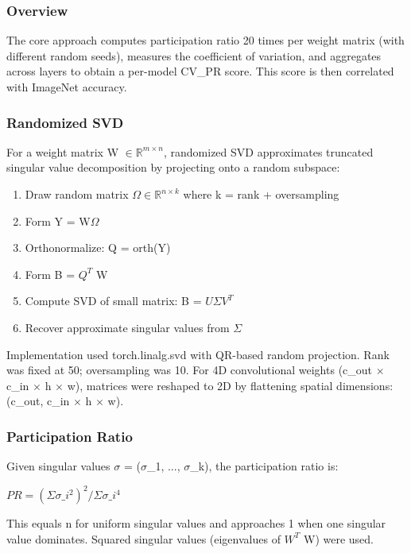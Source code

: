 
\subsubsection{Overview}

The core approach computes participation ratio 20 times per weight matrix (with different random seeds), measures the coefficient of variation, and aggregates across layers to obtain a per-model CV\_PR score. This score is then correlated with ImageNet accuracy.

\subsubsection{Randomized SVD}

For a weight matrix W $\in \mathbb{R}^{m\times n}$, randomized SVD \citep{Halko2011Finding} approximates truncated singular value decomposition by projecting onto a random subspace:

\begin{enumerate}
\item Draw random matrix $\Omega \in \mathbb{R}^{n\times k}$ where k = rank + oversampling
\item Form Y = W$\Omega$
\item Orthonormalize: Q = orth(Y)
\item Form B = $Q^T$ W
\item Compute SVD of small matrix: B = $U\Sigma V^T$
\item Recover approximate singular values from $\Sigma$
\end{enumerate}

Implementation used torch.linalg.svd with QR-based random projection. Rank was fixed at 50; oversampling was 10. For 4D convolutional weights (c\_out $\times$ c\_in $\times$ h $\times$ w), matrices were reshaped to 2D by flattening spatial dimensions: (c\_out, c\_in $\times$ h $\times$ w).

\subsubsection{Participation Ratio}

Given singular values $\sigma$ = ($\sigma$\_1, ..., $\sigma$\_k), the participation ratio is:

$PR = (\Sigma \sigma\_i^{2})^2 / \Sigma \sigma\_i^4$

This equals n for uniform singular values and approaches 1 when one singular value dominates. Squared singular values (eigenvalues of $W^T$ W) were used.

